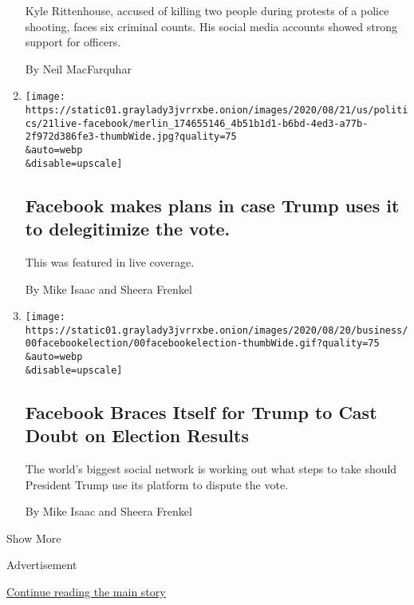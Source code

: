 \begin{enumerate}
  Kyle Rittenhouse, accused of killing two people during protests of a
  police shooting, faces six criminal counts. His social media accounts
  showed strong support for officers.

  By Neil MacFarquhar
\item
  \href{/live/2020/08/21/us/dnc-convention-election/facebook-makes-plans-in-case-trump-uses-it-to-delegitimize-the-vote}{}

  \texttt{[image: https://static01.graylady3jvrrxbe.onion/images/2020/08/21/us/politics/21live-facebook/merlin\_174655146\_4b51b1d1-b6bd-4ed3-a77b-2f972d386fe3-thumbWide.jpg?quality=75\\\&auto=webp\\\&disable=upscale]}

  \hypertarget{facebook-makes-plans-in-case-trump-uses-it-to-delegitimize-the-vote}{%
  \subsection{Facebook makes plans in case Trump uses it to delegitimize
  the
  vote.}\label{facebook-makes-plans-in-case-trump-uses-it-to-delegitimize-the-vote}}

  This was featured in live coverage.

  By Mike Isaac and Sheera Frenkel
\item
  \href{/2020/08/21/technology/facebook-trump-election.html}{}

  \texttt{[image: https://static01.graylady3jvrrxbe.onion/images/2020/08/20/business/00facebookelection/00facebookelection-thumbWide.gif?quality=75\\\&auto=webp\\\&disable=upscale]}

  \hypertarget{facebook-braces-itself-for-trump-to-cast-doubt-on-election-results}{%
  \subsection{Facebook Braces Itself for Trump to Cast Doubt on Election
  Results}\label{facebook-braces-itself-for-trump-to-cast-doubt-on-election-results}}

  The world's biggest social network is working out what steps to take
  should President Trump use its platform to dispute the vote.

  By Mike Isaac and Sheera Frenkel
\end{enumerate}

Show More

Advertisement

\protect\hyperlink{after-mid2}{Continue reading the main story}

